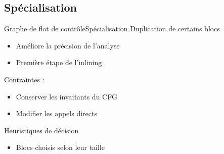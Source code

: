 \documentclass{beamer}
\begin{document}

\subsection{Spécialisation}

\begin{frame}{Graphe de flot de contrôle}{Spécialisation}
    Duplication de certains blocs

    \begin{itemize}
        \item Améliore la précision de l'analyse
        \item Première étape de l'inlining
    \end{itemize}

    Contraintes :

    \begin{itemize}
        \item Conserver les invariants du CFG
        \item Modifier les appels directs
    \end{itemize}

    Heuristiques de décision

    \begin{itemize}
        \item Blocs choisis selon leur taille
    \end{itemize}
\end{frame}
\end{document}
